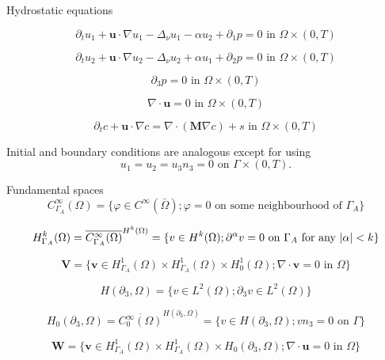 \documentclass{beamer}
\begin{document}
\begin{frame}{Hydrostatic equations}

$$\partial_t u_1 + \mathbf{u} \cdot \nabla u_1 - \Delta_\nu u_1 - \alpha u_2 + \partial_1 p = 0 \text{ in } \Omega \times (0,T) $$

$$ \partial_t u_2 + \mathbf{u} \cdot \nabla u_2 - \Delta_\nu u_2 + \alpha u_1 + \partial_2 p = 0 \text{ in } \Omega \times (0,T) $$

$$ \partial_3 p = 0 \text{ in } \Omega \times (0,T) $$

$$ \nabla \cdot \mathbf{u} = 0 \text{ in } \Omega \times (0,T) $$

$$ \partial_t c + \mathbf{u} \cdot \nabla c = \nabla \cdot (\mathbf{M} \nabla c) + s \text{ in } \Omega \times (0,T) $$

Initial and boundary conditions are analogous except for using $$ u_1 = u_2 = u_3 n_3 = 0 \text{ on } \Gamma \times (0,T). $$
\end{frame}

\begin{frame}{Fundamental spaces}
\[ C^{\infty}_{\Gamma_A} (\Omega) = \{ \varphi \in C^\infty (\bar{\Omega}); \varphi = 0 \text{ on some neighbourhood of } \Gamma_A \} \]

\[ H^k_{\Gamma_A} (\Omega) = \overline{C_{\Gamma_A} ^ \infty (\Omega)} ^ {H^k (\Omega)} = \{ v \in H^k(\Omega); \partial^\alpha v=0 \text{ on } \Gamma_A \text{ for any } \abs{\alpha} < k \} \]

\[ \mathbf{V} = \{ \mathbf{v} \in  H^1_{\Gamma_A} (\Omega) \times H^1_{\Gamma_A} (\Omega) \times H^1_0 (\Omega); \nabla \cdot \mathbf{v} = 0 \text{ in } \Omega \} \]

\[ H (\partial_3, \Omega) = \{ v \in L^2(\Omega); \partial_3 v \in L^2 (\Omega)\} \]

\[ H_0 (\partial_3, \Omega) = \overline{C_0 ^\infty (\Omega)}^{H (\partial_3, \Omega)} = \{ v \in H(\partial_3, \Omega); v n_3 = 0 \text{ on } \Gamma \} \]

\[ \mathbf{W} = \{ \mathbf{v} \in  H^1_{\Gamma_A} (\Omega) \times H^1_{\Gamma_A} (\Omega) \times H_0 (\partial_3, \Omega); \nabla \cdot \mathbf{u} = 0 \text{ in } \Omega \} \]
\end{frame}
\end{document}
